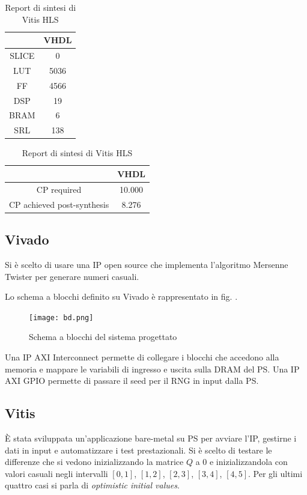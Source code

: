 \documentclass{article}
\begin{document}
\begin{table}[h!]

\centering

\begin{tabular}{|c|c|}
\hline
 &VHDL \\
 \hline
SLICE &0 \\
 \hline
LUT &5036 \\
 \hline
FF &4566 \\
 \hline
DSP &19 \\
 \hline
BRAM &6 \\
 \hline
SRL &138 \\
 \hline

\end{tabular}

\vspace{1em}

\begin{tabular}{|c|c|}
\hline 
 &VHDL \\
 \hline 
CP required &10.000 \\
 \hline 
CP achieved post-synthesis &8.276 \\
 \hline 
\end{tabular}
\caption{Report di sintesi di Vitis HLS}
\label{table:synthesis}

\end{table}
\subsection{Vivado}
Si è scelto di usare una IP open source \citep{fedorko_wfedorkomersenne-twister-hls_2018} che implementa l'algoritmo Mersenne Twister per generare numeri casuali. 

Lo schema a blocchi definito su Vivado è rappresentato in fig. .
\begin{figure}[h!]

\centering


\texttt{[image: bd.png]}
\caption{Schema a blocchi del sistema progettato}
\label{fig:bd}
\end{figure}

Una IP AXI Interconnect permette di collegare i blocchi che accedono alla memoria e mappare le variabili di ingresso e uscita sulla DRAM del PS. 
Una IP AXI GPIO permette di passare il seed per il RNG in input dalla PS.

\subsection{Vitis}
È stata sviluppata un'applicazione bare-metal su PS per avviare l'IP, gestirne i dati in input e automatizzare i test prestazionali. 
Si è scelto di testare le differenze che si vedono inizializzando la matrice $Q$ a 0 e inizializzandola con valori casuali negli intervalli $[0, 1]$, $[1, 2]$, $[2, 3]$, $[3, 4]$, $[4, 5]$. 
Per gli ultimi quattro casi si parla di \emph{optimistic initial values}.
\end{document}
